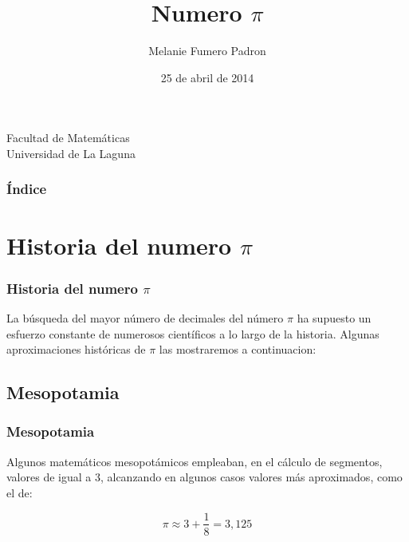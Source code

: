 \documentclass{beamer}
\title[Presentación con Beamer]{Numero $\pi$}
\author{Melanie Fumero Padron}
\date[25-04-2014]{25 de abril de 2014}
\begin{document}
  
\begin{frame}

  \hspace*{7.0cm}
  \titlepage

  \begin{small}
    \begin{center}
     Facultad de Matemáticas \\
     Universidad de La Laguna
    \end{center}
  \end{small}

\end{frame}

\begin{frame}
  \frametitle{Índice}  
  \tableofcontents[pausesections]
\end{frame}


\section{Historia del numero $\pi$}


\begin{frame}
\frametitle{Historia del numero $\pi$}

La búsqueda del mayor número de decimales del número $\pi$ ha supuesto un esfuerzo constante de numerosos científicos a lo largo de la historia.
Algunas aproximaciones históricas de $\pi$ las mostraremos a continuacion:
\end {frame}
\subsection{Mesopotamia}

\begin {frame}
\frametitle {Mesopotamia}

Algunos matemáticos mesopotámicos empleaban, en el cálculo de segmentos, valores de  igual a 3, alcanzando en algunos casos valores más aproximados, como el de:

\begin{equation}
\pi \approx 3 + \frac{1}{8} = 3,125 
\end{equation}
\end {frame}
\end{document}
